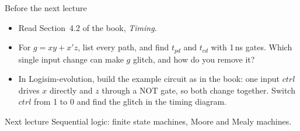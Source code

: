 \documentclass[10pt]{wosm-slides}
\begin{document}
\begin{frame}{Before the next lecture}
  \begin{itemize}
    \item Read Section~4.2 of the book, \emph{Timing}.
    \item For $g = xy + x'z$, list every path, and find $t_{pd}$ and $t_{cd}$ with 1\,ns
      gates. Which single input change can make $g$ glitch, and how do you remove it?
    \item In Logisim-evolution, build the example circuit as in the book: one input
      $\mathit{ctrl}$ drives $x$ directly and $z$ through a NOT gate, so both change
      together. Switch $\mathit{ctrl}$ from 1 to 0 and find the glitch in the timing
      diagram.
  \end{itemize}

  \begin{block}{Next lecture }
    Sequential logic: finite state machines, Moore and Mealy machines.
  \end{block}
\end{frame}
\end{document}
